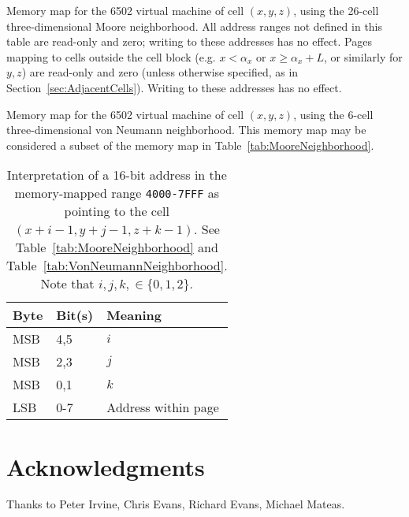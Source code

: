 \documentclass{article}
\newcommand\hex[1]{{\tt #1}}
\newcommand\hexrange[2]{\hex{#1}{\tt -}\hex{#2}}
\begin{document}
\begin{table}
\mooremap
\caption{
  \label{tab:MooreNeighborhood}
  Memory map for the 6502 virtual machine of cell $(x,y,z)$,
  using the 26-cell three-dimensional Moore neighborhood.
  All address ranges not defined in this table are read-only and zero;
  writing to these addresses has no effect.
  Pages mapping to cells outside the cell block (e.g. $x<\alpha_x$ or $x \geq \alpha_x+L$, or similarly for $y,z$)
  are read-only and zero (unless otherwise specified, as in Section~\ref{sec:AdjacentCells}).
  Writing to these addresses has no effect.
}
\end{table}

\begin{table}
\vonneumannmap
\caption{
  \label{tab:VonNeumannNeighborhood}
  Memory map for the 6502 virtual machine of cell $(x,y,z)$,
  using the 6-cell three-dimensional von Neumann neighborhood.
  This memory map may be considered a subset of the memory map in Table~\ref{tab:MooreNeighborhood}.
}
\end{table}

\begin{table}
\begin{tabular}{lll}
  \hline
  Byte & Bit(s) & Meaning \\
  \hline
  MSB & 4,5 & $i$ \\
  MSB & 2,3 & $j$ \\
  MSB & 0,1 & $k$ \\
  LSB & 0-7 & Address within page \\
  \hline
\end{tabular}
\caption{
  Interpretation of a 16-bit address in the memory-mapped range \hexrange{4000}{7FFF}
  as pointing to the cell $(x+i-1,y+j-1,z+k-1)$.
  See Table~\ref{tab:MooreNeighborhood} and Table~\ref{tab:VonNeumannNeighborhood}.
  Note that $i,j,k, \in \{ 0,1,2 \}$.
  \label{tab:AddressBits}
}
\end{table}

\section*{Acknowledgments}
Thanks to Peter Irvine, Chris Evans, Richard Evans, Michael Mateas.



\end{document}
